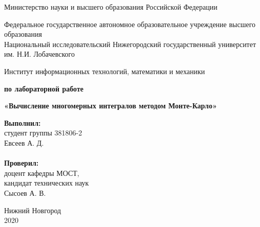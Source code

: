 \documentclass{report}
\begin{document}
\begin{titlepage}

\begin{center}
Министерство науки и высшего образования Российской Федерации
\end{center}

\begin{center}
Федеральное государственное автономное образовательное учреждение высшего образования \\
Национальный исследовательский Нижегородский государственный университет им. Н.И. Лобачевского
\end{center}

\begin{center}
Институт информационных технологий, математики и механики
\end{center}

\vspace{4em}

\begin{center}
\textbf{ по лабораторной работе} \\
\end{center}
\begin{center}
\textbf{\Large«Вычисление многомерных интегралов методом Монте-Карло»} \\
\end{center}

\vspace{4em}

\newbox{\lbox}
\newlength{\maxl}
\setlength{\maxl}{\wd\lbox}
\hfill\parbox{7cm}{
\hspace*{5cm}\hspace*{-5cm}\textbf{Выполнил:} \\ студент группы 381806-2 \\ Евсеев А. Д.\\
\\
\hspace*{5cm}\hspace*{-5cm}\textbf{Проверил:}\\ доцент кафедры МОСТ, \\ кандидат технических наук \\ Сысоев А. В.\\
}

\vspace{\fill}

\begin{center} Нижний Новгород \\ 2020 \end{center}

\end{titlepage}
\end{document}
